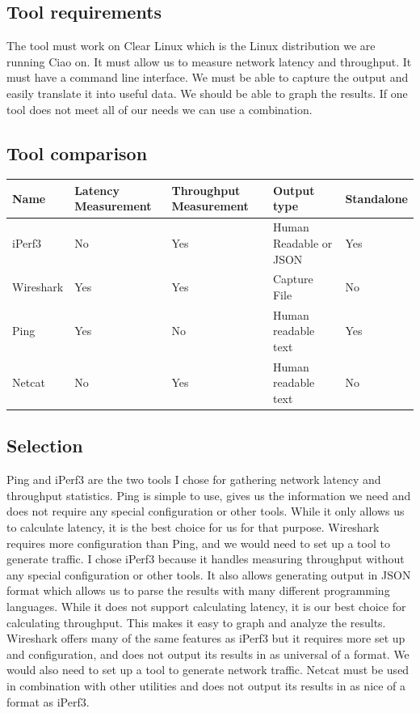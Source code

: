 \documentclass[10pt,letterpaper,onecolumn,draftclsnofoot]{IEEEtran}
\begin{document}
\subsection{Tool requirements}
The tool must work on Clear Linux which is the Linux distribution we are running Ciao on.
It must allow us to measure network latency and throughput. 
It must have a command line interface.
We must be able to capture the output and easily translate it into useful data. 
We should be able to graph the results. 
If one tool does not meet all of our needs we can use a combination. 

\subsection{Tool comparison}

\begin{center}
	\begin{tabular}{| l | l | l | l | l |}
		\hline
		Name & Latency Measurement & Throughput Measurement & Output type & Standalone \\ \hline
		iPerf3 & No & Yes & Human Readable or JSON & Yes \\ \hline
		Wireshark & Yes & Yes & Capture File & No \\ \hline
		Ping & Yes & No & Human readable text & Yes \\ \hline
                Netcat & No & Yes & Human readable text & No \\ \hline
	\end{tabular}
\end{center}

\subsection{Selection}
Ping and iPerf3 are the two tools I chose for gathering network latency and throughput statistics.
Ping is simple to use, gives us the information we need and does not require any special configuration or other tools. While it only allows us to calculate latency, it is the best choice for us for that purpose.
Wireshark requires more configuration than Ping, and we would need to set up a tool to generate traffic.
I chose iPerf3 because it handles measuring throughput without any special configuration or other tools.
It also allows generating output in JSON format which allows us to parse the results with many different programming languages. 
While it does not support calculating latency, it is our best choice for calculating throughput.
This makes it easy to graph and analyze the results.
Wireshark offers many of the same features as iPerf3 but it requires more set up and configuration, and does not output its results in as universal of a format. 
We would also need to set up a tool to generate network traffic.
Netcat must be used in combination with other utilities and does not output its results in as nice of a format as iPerf3.
\end{document}
